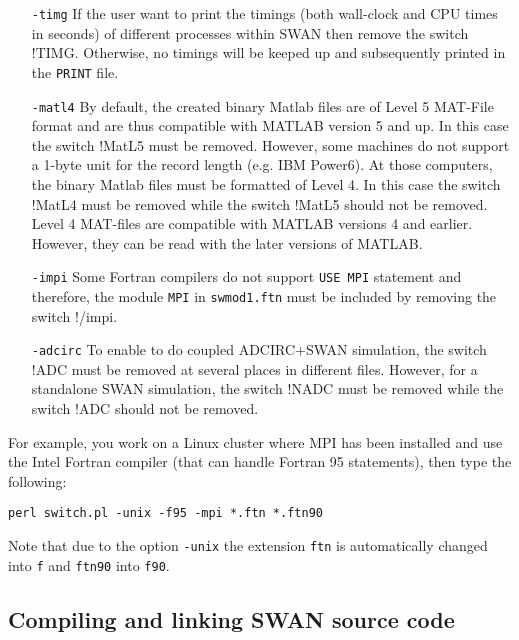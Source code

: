 \documentclass[12pt]{book}
\begin{document}
\begin{itemize}
  \item[{\tt -timg}]
  If the user want to print the timings (both wall-clock and CPU times in seconds) of different
  processes within SWAN then remove the switch !TIMG. Otherwise, no timings will be keeped up
  and subsequently printed in the {\tt PRINT} file.
  \item[{\tt -matl4}]
  By default, the created binary Matlab files are of Level 5 MAT-File format and are thus
  compatible with MATLAB version 5 and up. In this case the switch !MatL5 must be removed.
  However, some machines do not support a 1-byte unit for the record length (e.g. IBM Power6).
  At those computers, the binary Matlab files must be formatted of Level 4. In this case the
  switch !MatL4 must be removed while the switch !MatL5 should not be removed. Level 4 MAT-files
  are compatible with MATLAB versions 4 and earlier. However, they can be read with the later
  versions of MATLAB.
  \item[{\tt -impi}]
  Some Fortran compilers do not support {\tt USE MPI} statement and therefore,
  the module {\tt MPI} in {\tt swmod1.ftn} must be included by removing the switch !/impi.
  \item[{\tt -adcirc}]
  To enable to do coupled ADCIRC+SWAN simulation, the switch !ADC must be removed at several places
  in different files. However, for a standalone SWAN simulation, the switch !NADC must be
  removed while the switch !ADC should not be removed.
\end{itemize}

\noindent
For example, you work on a Linux cluster where MPI has been installed and use the Intel Fortran
compiler (that can handle Fortran 95 statements), then type the following:
\begin{verbatim}
perl switch.pl -unix -f95 -mpi *.ftn *.ftn90
\end{verbatim}
Note that due to the option {\tt -unix} the extension {\tt ftn} is automatically changed into {\tt f}
and {\tt ftn90} into {\tt f90}.

\subsection{Compiling and linking SWAN source code}
\end{document}
